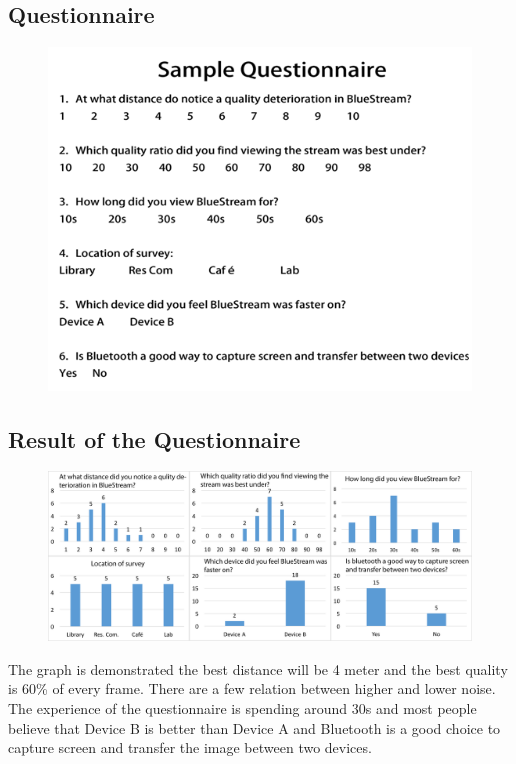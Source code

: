 \documentclass[a4paper,12pt]{article}
\begin{document}
\subsection{Questionnaire}
\begin{figure}[h!]
\centering
\includegraphics[scale=.7]{Figures/Questionnaire.png}
\end{figure}

\subsection{Result of the Questionnaire}
\begin{figure}[h!]
\centering
\includegraphics[scale=.4]{Figures/Result.png}
\end{figure}

The graph is demonstrated the best distance will be 4 meter and the best quality is 60\% of every frame. There are a few relation between higher and lower noise. The experience of the questionnaire is spending around 30s and most people believe that Device B is better than Device A and Bluetooth is a good choice to capture screen and transfer the image between two devices.
\end{document}
